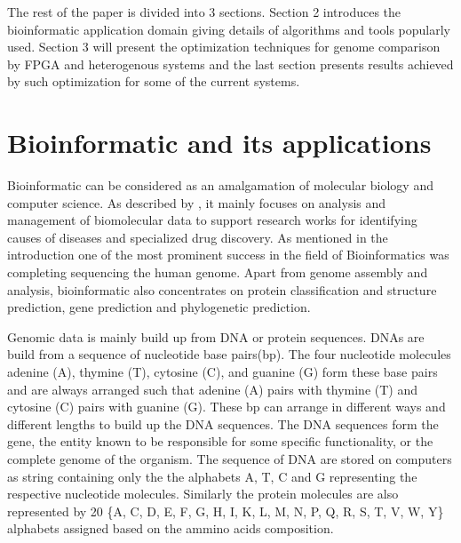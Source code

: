 \documentclass[12pt,twoside]{article}
\begin{document}
The rest of the paper is divided into 3 sections. Section 2 introduces the bioinformatic application domain giving
details of algorithms and tools popularly used. Section 3 will present the optimization techniques for genome
comparison by FPGA and heterogenous systems and the last section presents results achieved by such optimization
for some of the current systems.

\section {Bioinformatic and its applications}

Bioinformatic can be considered as an amalgamation of molecular biology and computer science.
As described by \textcite[chapter 8]{gokhale_reconfigurable_2010}, it mainly focuses on analysis
and management of biomolecular data to support research works for identifying causes of diseases and
specialized drug discovery. As mentioned in the introduction one of the most prominent success in
the field of Bioinformatics was completing sequencing the human genome. Apart from genome assembly
and analysis, bioinformatic also concentrates on protein classification and structure prediction,
gene prediction and phylogenetic prediction.

Genomic data is mainly build up from DNA or protein sequences. DNAs are build from a sequence of
nucleotide base pairs(bp). The four nucleotide molecules adenine (A), thymine (T), cytosine (C), and guanine (G)
form these base pairs and are always arranged such that adenine (A) pairs with thymine (T) and
cytosine (C) pairs with guanine (G). These bp can arrange in different ways and different lengths to build up the DNA
sequences. The DNA sequences form the gene, the entity known to be responsible for some specific functionality,
or the complete genome of the organism. The sequence of DNA are stored on computers as string containing only the
the alphabets A, T, C and G representing the respective nucleotide molecules. Similarly the protein molecules
are also represented by 20 \{A, C, D, E, F, G, H, I, K, L, M, N, P, Q, R, S, T, V, W, Y\} alphabets assigned
based on the ammino acids composition.
\end{document}
